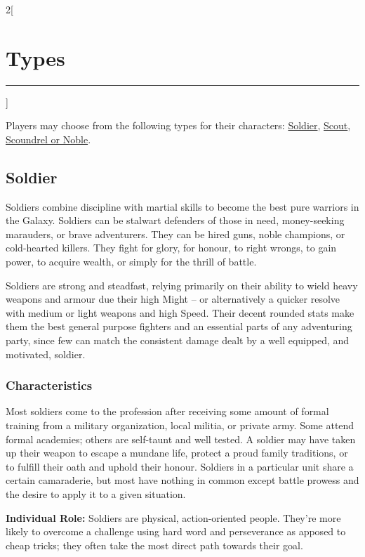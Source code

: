 \documentclass[a4paper,10pt,final]{book}
\newcommand{\HRule}{\rule{\linewidth}{0.5mm}} %
\newcommand{\newSection}[1]{\section*{#1} \addcontentsline{toc}{section}{#1} \label{sec:#1} \HRule}
\newcommand{\itemLine}[2]{\textbf{#1:} {#2}\par}
\newenvironment{docsection}[1]
{
  \begin{multicols*}{2}[\newSection{#1}]
}
{
  \end{multicols*}
  \newpage
}
\begin{document}
\begin{docsection}{Types}

Players may choose from the following types for their characters: \hyperlink{sub:soldier}{Soldier}, \hyperlink{sub:scout}{Scout}, \hyperlink{sub:scoundrel_noble}{Scoundrel or Noble}.

\subsection*{Soldier} %
\label{sub:soldier}

Soldiers combine discipline with martial skills to become the best pure warriors in the Galaxy. Soldiers can be stalwart defenders of those in need, money-seeking marauders, or brave adventurers. They can be hired guns, noble champions, or cold-hearted killers. They fight for glory, for honour, to right wrongs, to gain power, to acquire wealth,  or simply for the thrill of battle. \par

Soldiers are strong and steadfast, relying primarily on their ability to wield heavy weapons and armour due their high Might -- or alternatively a quicker resolve with medium or light weapons and high Speed. Their decent rounded stats make them the best general purpose fighters and an essential parts of any adventuring party, since few can match the consistent damage dealt by a well equipped, and motivated, soldier.

\subsubsection*{Characteristics}
\label{subsub:soldierCharacteristics}

Most soldiers come to the profession after receiving some amount of formal training from a military organization, local militia, or private army. Some attend formal academies; others are self-taunt and well tested. A soldier may have taken up their weapon to escape a mundane life, protect a proud family traditions, or to fulfill their oath and uphold their honour. Soldiers in a particular unit share a certain camaraderie, but most have nothing in common except battle prowess and the desire to apply it to a given situation. \par

\itemLine{Individual Role} {Soldiers are physical, action-oriented people. They're more likely to overcome a challenge using hard word and perseverance as apposed to cheap tricks; they often take the most direct path towards their goal.}


\end{docsection}
\end{document}
